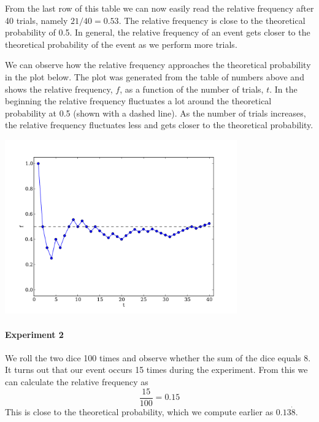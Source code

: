 \documentclass[a4paper,11pt]{report}
\begin{document}
From the last row of this table we can now easily read the relative
frequency after 40 trials, namely $21/40 = 0.53$. The relative
frequency is close to the theoretical probability of 0.5. In general,
the relative frequency of an event gets closer to the theoretical
probability of the event as we perform more trials.

We can observe how the relative frequency approaches the theoretical
probability in the plot below. The plot was generated from the table
of numbers above and shows the relative frequency, $f$, as a function
of the number of trials, $t$. In the beginning the relative frequency
fluctuates a lot around the theoretical probability at 0.5 (shown with
a dashed line). As the number of trials increases, the relative
frequency fluctuates less and gets closer to the theoretical
probability.

\begin{center}
\includegraphics[width=0.75\textwidth]{coin_toss_trials.pdf}
\end{center}

\paragraph{Experiment 2} We roll the two dice 100 times and observe
whether the sum of the dice equals 8. It turns out that our event
occurs 15 times during the experiment. From this we can calculate the
relative frequency as
\[\frac{15}{100}=0.15\]
This is close to the theoretical probability, which we compute earlier
as $0.13\dot{8}$.
\end{document}
